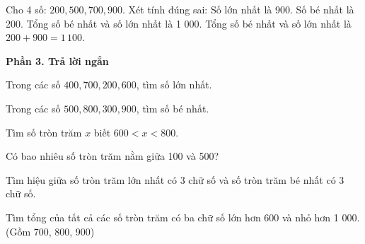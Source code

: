 \begin{ex} %
Cho 4 số: $200, 500, 700, 900$. Xét tính đúng sai:
\choiceTF
{\True Số lớn nhất là 900.}
{\True Số bé nhất là 200.}
{Tổng số bé nhất và số lớn nhất là 1 000.}
{\True Tổng số bé nhất và số lớn nhất là $200 + 900 = 1\,100$.}
\end{ex}

\textbf{Phần 3. Trả lời ngắn}

\begin{ex} %
Trong các số $400, 700, 200, 600$, tìm số lớn nhất.
\end{ex}

\begin{ex} %
Trong các số $500, 800, 300, 900$, tìm số bé nhất.
\end{ex}

\begin{ex} %
Tìm số tròn trăm $x$ biết $600 < x < 800$.
\end{ex}

\begin{ex} %
Có bao nhiêu số tròn trăm nằm giữa 100 và 500?
\end{ex}

\begin{ex} %
Tìm hiệu giữa số tròn trăm lớn nhất có 3 chữ số và số tròn trăm bé nhất có 3 chữ số.
\end{ex}

\begin{ex} %
Tìm tổng của tất cả các số tròn trăm có ba chữ số lớn hơn 600 và nhỏ hơn 1 000. (Gồm 700, 800, 900)
\end{ex}
